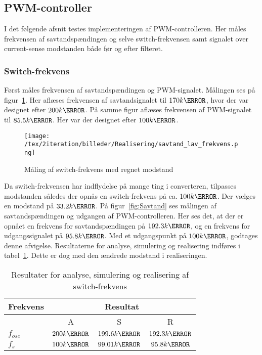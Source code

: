 \subsection{PWM-controller}
\noindent I det følgende afsnit testes implementeringen af PWM-controlleren. Her måles frekvensen af savtandspændingen og selve switch-frekvensen samt signalet over current-sense modstanden både før og efter filteret.

\subsubsection{Switch-frekvens}
\noindent Først måles frekvensen af savtandspændingen og PWM-signalet. Målingen ses på figur~\ref{fig:Savtand_lav_frekvens}. Her aflæses frekvensen af savtandsignalet til $170k\hertz$, hvor der var designet efter $200k\hertz$. På samme figur aflæses frekvensen af PWM-signalet til $85.5k\hertz$. Her var der designet efter $100k\hertz$.

\begin{figure}[H]
	\center
	\texttt{[image: /tex/2iteration/billeder/Realisering/savtand\_lav\_frekvens.png]}
	\caption{Måling af switch-frekvens med regnet modstand}
	\label{fig:Savtand_lav_frekvens}
\end{figure} 

Da switch-frekvensen har indflydelse på mange ting i converteren, tilpasses modstanden således der opnås en switch-frekvens på ca. $100k\hertz$. Der vælges en modstand på $33.2k\ohm$. På figur~\ref{fig:Savtand} ses målingen af savtandspændingen og udgangen af PWM-controlleren. Her ses det, at der er opnået en frekvens for savtandspændingen på $192.3k\hertz$, og en frekvens for udgangssignalet på $95.8k\hertz$. Med et udgangspunkt på $100k\hertz$, godtages denne afvigelse. Resultaterne for analyse, simulering og realisering indføres i tabel~\ref{tab:resultat_switch_frekvens}. Dette er dog med den ændrede modstand i realiseringen.

\begin{table}[H] 			
	\centering
	\begin{tabularx}{\textwidth}{|X|c|c|c|}
		\hline
		\textbf{Frekvens} & \multicolumn{3}{|c|}{\textbf{Resultat}} 		\\ \hline
		& A & S & R 									\\ \hline
		$f_{osc}$ & $200k\hertz$ & $199.6k\hertz$ & $192.3k\hertz$ 									\\ \hline 
		$f_s$ & $100k\hertz$ & $99.01k\hertz$ & $95.8k\hertz$ 									\\ \hline
	\end{tabularx}
	\caption{Resultater for analyse, simulering og realisering af switch-frekvens}
	\label{tab:resultat_switch_frekvens}
\end{table}


